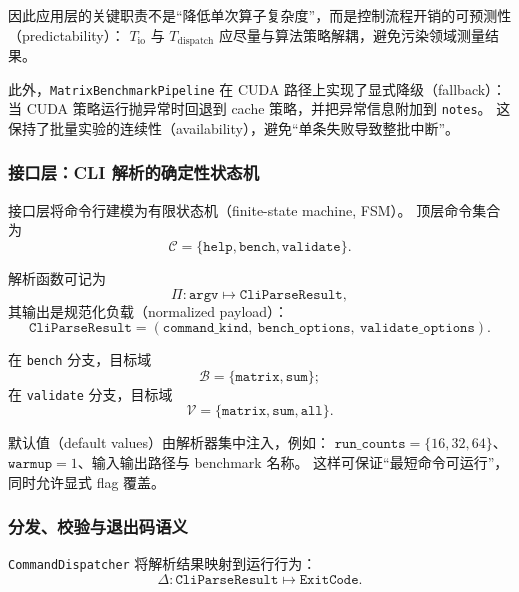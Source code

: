 因此应用层的关键职责不是“降低单次算子复杂度”，而是控制流程开销的可预测性（predictability）：
\(T_{\text{io}}\) 与 \(T_{\text{dispatch}}\) 应尽量与算法策略解耦，避免污染领域测量结果。

此外，\texttt{MatrixBenchmarkPipeline} 在 CUDA 路径上实现了显式降级（fallback）：
当 CUDA 策略运行抛异常时回退到 cache 策略，并把异常信息附加到 \texttt{notes}。
这保持了批量实验的连续性（availability），避免“单条失败导致整批中断”。

\subsubsection{接口层：CLI 解析的确定性状态机}

接口层将命令行建模为有限状态机（finite-state machine, FSM）。
顶层命令集合为
\begin{equation}
\mathcal{C}=\{\texttt{help},\texttt{bench},\texttt{validate}\}.
\end{equation}

解析函数可记为
\begin{equation}
\Pi: \texttt{argv} \mapsto \texttt{CliParseResult},
\end{equation}
其输出是规范化负载（normalized payload）：
\begin{equation}
\texttt{CliParseResult}=(\texttt{command\_kind},\ \texttt{bench\_options},\ \texttt{validate\_options}).
\end{equation}

在 \texttt{bench} 分支，目标域
\begin{equation}
\mathcal{B}=\{\texttt{matrix},\texttt{sum}\};
\end{equation}
在 \texttt{validate} 分支，目标域
\begin{equation}
\mathcal{V}=\{\texttt{matrix},\texttt{sum},\texttt{all}\}.
\end{equation}

默认值（default values）由解析器集中注入，例如：
\(\texttt{run\_counts}=\{16,32,64\}\)、\(\texttt{warmup}=1\)、输入输出路径与 benchmark 名称。
这样可保证“最短命令可运行”，同时允许显式 flag 覆盖。

\subsubsection{分发、校验与退出码语义}

\texttt{CommandDispatcher} 将解析结果映射到运行行为：
\begin{equation}
\Delta: \texttt{CliParseResult} \mapsto \texttt{ExitCode}.
\end{equation}

